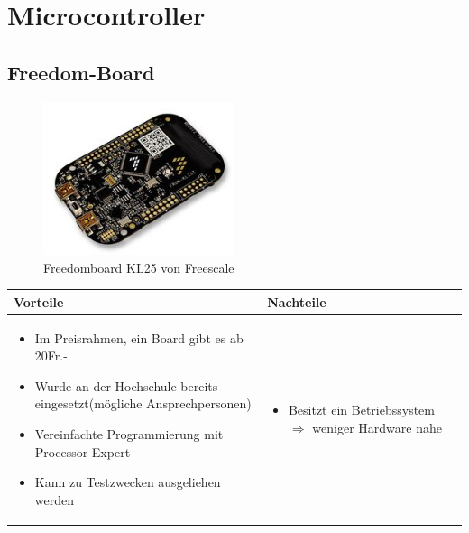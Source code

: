 
\section{Microcontroller}


\subsection{Freedom-Board}
\begin{figure}[h]
	\centering
	\includegraphics[width=0.5\textwidth]{fig/freedomboard.png}
	\caption{Freedomboard KL25 von Freescale}
\end{figure}


\begin{table}[h]
\begin{tabular}{p{} | p{}}


 \textbf{Vorteile} & \textbf{Nachteile} \\ \hline
	 
\begin{itemize}
\item Im Preisrahmen, ein Board gibt es ab 20Fr.-
\item Wurde an der Hochschule bereits eingesetzt(mögliche Ansprechpersonen)
\item Vereinfachte Programmierung mit Processor Expert
\item Kann zu Testzwecken ausgeliehen werden
\end{itemize}

 &
 
\begin{itemize}
\item Besitzt ein Betriebssystem $\Rightarrow$ weniger Hardware nahe
\end{itemize}

\end{tabular}
\end{table}

